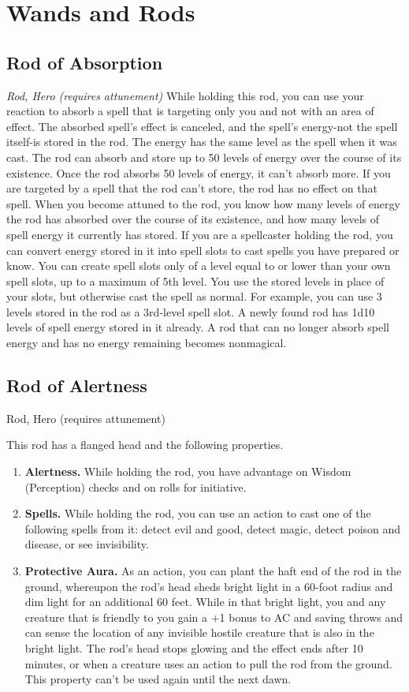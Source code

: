 \section{Wands and Rods}

\subsection{Rod of Absorption}
\textit{Rod, Hero (requires attunement)}
While holding this rod, you can use your reaction to absorb a spell that is targeting only you and not with an area of effect. The absorbed spell's effect is canceled, and the spell's energy-not the spell itself-is stored in the rod. The energy has the same level as the spell when it was cast. The rod can absorb and store up to 50 levels of energy over the course of its existence. Once the rod absorbs 50 levels of energy, it can't absorb more. If you are targeted by a spell that the rod can't store, the rod has no effect on that spell.
When you become attuned to the rod, you know how many levels of energy the rod has absorbed over the course of its existence, and how many levels of spell energy it currently has stored.
If you are a spellcaster holding the rod, you can convert energy stored in it into spell slots to cast spells you have prepared or know. You can create spell slots only of a level equal to or lower than your own spell slots, up to a maximum of 5th level. You use the stored levels in place of your slots, but otherwise cast the spell as normal. For example, you can use 3 levels stored in the rod as a 3rd-level spell slot.
A newly found rod has 1d10 levels of spell energy stored in it already. A rod that can no longer absorb spell energy and has no energy remaining becomes nonmagical.

\subsection{Rod of Alertness}
Rod, Hero (requires attunement) 

This rod has a flanged head and the following properties.
\begin{enumerate}

\item \textbf{Alertness.} While holding the rod, you have advantage on Wisdom (Perception) checks and on rolls for initiative.
\item \textbf{Spells.} While holding the rod, you can use an action to cast one of the following spells from it: detect evil and good, detect magic, detect poison and disease, or see invisibility.
\item \textbf{Protective Aura.} As an action, you can plant the haft end of the rod in the ground, whereupon the rod's head sheds bright light in a 60-foot radius and dim light for an additional 60 feet. While in that bright light, you and any creature that is friendly to you gain a +1 bonus to AC and saving throws and can sense the location of any invisible hostile creature that is also in the bright light.  The rod's head stops glowing and the effect ends after 10 minutes, or when a creature uses an action to pull the rod from the ground. This property can't be used again until the next dawn.
\end{enumerate}

